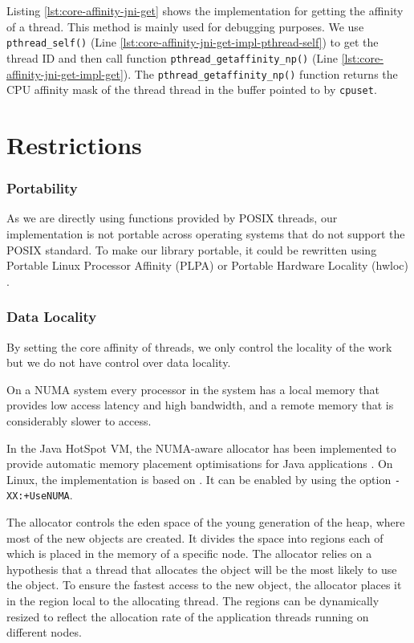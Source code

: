 Listing \ref{lst:core-affinity-jni-get} shows the implementation for
getting the affinity of a thread. This method is mainly used for
debugging purposes. We use \lstinline!pthread_self()! (Line
\ref{lst:core-affinity-jni-get-impl-pthread-self}) to get the thread
ID and then call function \lstinline!pthread_getaffinity_np()!  (Line
\ref{lst:core-affinity-jni-get-impl-get}). The
\lstinline!pthread_getaffinity_np()! function returns the CPU affinity
mask of the thread thread in the buffer pointed to by
\lstinline!cpuset!.




\section{Restrictions}
\label{sec:appendix-core-affinity-restrictions}

\subsubsection{Portability}

As we are directly using functions provided by POSIX threads, our
implementation is not portable across operating systems that do not
support the POSIX standard. To make our library portable, it could be
rewritten using Portable Linux Processor Affinity (PLPA)
\cite{OpenMPI2010a} or Portable Hardware Locality (hwloc)
\cite{OpenMPI2010}.

\subsubsection{Data Locality}

By setting the core affinity of threads, we only control the locality
of the work but we do not have control over data locality.

On a NUMA system every processor in the system has a local memory that
provides low access latency and high bandwidth, and a remote memory
that is considerably slower to access.

In the Java HotSpot VM, the NUMA-aware allocator has been implemented
to provide automatic memory placement optimisations for Java
applications \cite{Masamitsu2008, Oracle2010, Humble2010}. On Linux,
the implementation is based on \cite{Kleen2004}. It can be enabled by
using the option \verb!-XX:+UseNUMA!.

The allocator controls the eden space of the young generation of the
heap, where most of the new objects are created. It divides the space
into regions each of which is placed in the memory of a specific
node. The allocator relies on a hypothesis that a thread that
allocates the object will be the most likely to use the object. To
ensure the fastest access to the new object, the allocator places it
in the region local to the allocating thread. The regions can be
dynamically resized to reflect the allocation rate of the application
threads running on different nodes.

